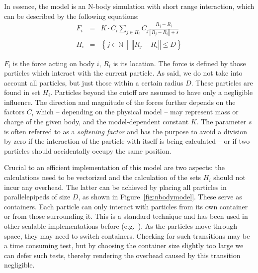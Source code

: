 \documentclass{sig-alternate}
\newcommand{\upp}{\vspace*{-0.5em}}
\newcommand{\up}{\vspace*{-0.25em}}
\begin{document}
In essence, the model is an N-body simulation with short range
interaction, which can be described by the following equations:
\upp
\begin{eqnarray*}
  F_i &=& K \cdot C_i \sum_{j \in H_i} C_j \frac{R_j - R_i}{\left\Vert R_j - R_i\right\Vert + s} \\
  H_i &=& \left\{ j \in \mathbb{N} \,\middle|\, \left\Vert R_j - R_i\right\Vert \le D  \right\}
\end{eqnarray*}
\upp
\upp

$F_i$ is the force acting on body $i$, $R_i$ is its location. The
force is defined by those particles which interact with the current
particle. As said, we do not take into account all particles, but just
those within a certain radius $D$. These particles are found in set
$H_i$. Particles beyond the cutoff are assumed to have only a
negligible influence. The direction and magnitude of the forces
further depends on the factors $C_i$ which -- depending on the
physical model -- may represent mass or charge of the given body, and
the model-dependent constant $K$. The parameter $s$ is often referred
to as a \emph{softening factor} and has the purpose to avoid a
division by zero if the interaction of the particle with itself is
being calculated -- or if two particles should accidentally occupy the
same position.

Crucial to an efficient implementation of this model are two aspects:
the calculations need to be vectorized and the calculation of the sets
$H_i$ should not incur any overhead. The latter can be achieved by
placing all particles in parallelepipeds of size $D$, as shown in Figure~\ref{fig:nbodymodel}. These serve as
containers. Each particle can only interact with particles from its
own container or from those surrounding it. This is a
standard technique and has been used in other scalable implementations
before (e.g.~\cite{blueMatter}). As the particles move through space,
they may need to switch containers. Checking for such transitions may
be a time consuming test, but by choosing the container size slightly
too large we can defer such tests, thereby rendering the overhead
caused by this transition negligible.
\end{document}
